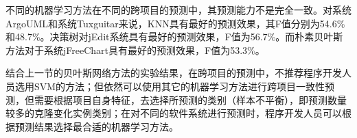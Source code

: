 不同的机器学习方法在不同的跨项目的预测中，其预测能力不是完全一致。对系统ArgoUML和系统Tuxguitar来说，KNN具有最好的预测效果，其F值分别为54.6\%和48.7\%。决策树对jEdit系统具有最好的预测效果，F值为56.7\%。而朴素贝叶斯方法对于系统jFreeChart具有最好的预测效果，F值为53.3\%。

结合上一节的贝叶斯网络方法的实验结果，在跨项目的预测中，不推荐程序开发人员选用SVM的方法；但依然可以使用其它的机器学习方法进行跨项目一致性预测，但需要根据项目自身特征，去选择所预测的类别（样本不平衡），即预测数量较多的克隆变化实例类别；在对不同的软件系统进行预测时，程序开发人员可以根据预测结果选择最合适的机器学习方法。


